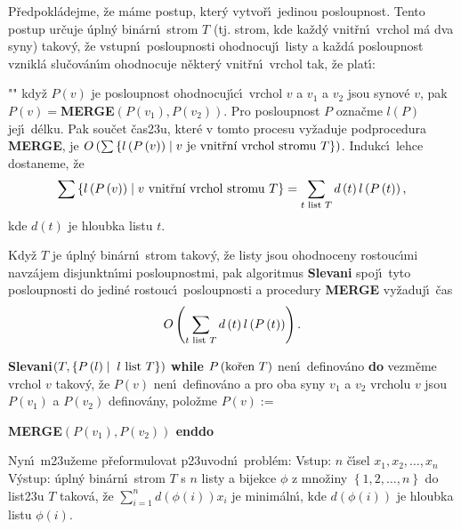 \flushpar P\v redpokl\'adejme, \v ze m\'ame postup, kter\'y vytvo\v r\'\i\ 
jedinou po\-sloupnost. Tento postup ur\v cuje \'upln\'y 
bin\'arn\'\i\ strom $T$ (tj. strom, kde ka\v zd\'y vnit\v rn\'\i\ 
vrchol m\'a dva syny) tako\-v\'y, \v ze vstupn\'\i\ posloupnosti 
ohodnocuj\'\i\ listy a ka\v zd\'a posloupnost vznik\-l\'a slu\v cov\'an\'\i m 
ohodnocuje n\v ekter\'y vnit\v rn\'\i\ vrchol tak, \v ze plat\'\i :
\roster
\item"{}"
kdy\v z $P\left(v\right)$ je posloupnost ohodnocuj\'\i c\'\i\ vrchol $v$ 
a $v_1$ a $v_2$ jsou synov\'e $v$, pak 
$P\left(v\right)=${\bf MERGE$\left(P\left(v_1\right),P\left(v_2\right)\right)$}.
\endroster
Pro posloupnost $P$ ozna\v cme $l\left(P\right)$ jej\'\i\ d\'elku. Pak sou\v cet 
\v cas\accent23u, kter\'e v tomto procesu vy\v zaduje 
podprocedura {\bf MERGE},
je $O\left(\sum \left\{l\left(P\left(v\right)\right)\mid v\text{\rm \ je vnit\v rn\'\i\ vrchol stromu }
T\right\}\right)$. Indukc\'\i\ 
lehce dostaneme, \v ze 
$$\sum \left\{l\left(P\left(v\right)\right)\mid v\text{\rm\ vnit\v rn\'\i\ vrchol stromu }T\right\}
=\sum_{t\text{\rm\ list }T}d\left(t\right)l\left(P\left(t\right)\right),$$
kde $d\left(t\right)$ je hloubka listu $t$.
\medskip

\flushpar Kdy\v z $T$ je \'upln\'y bin\'arn\'\i\ strom takov\'y, \v ze listy
jsou ohodnoceny rostouc\'\i mi navz\'ajem disjunktn\'\i mi 
posloupnostmi, pak algoritmus {\bf Slevani} spoj\'\i\ tyto  
posloupnosti do jedin\'e rostouc\'\i\ posloupnosti a procedury 
{\bf MERGE}  vy\v zaduj\'\i\ \v cas 
$$O\left(\sum_{t\text{\rm\ list }T}d\left(t\right)l\left(P\left(t\right)\right)\right).$$
\bigskip

{\bf Slevani$\left(T,\left\{P\left(l\right)\mid\;l\text{\rm \ {list }}T\right\}\right)$\newline }
{\bf while} $P\left(\text{\rm ko\v ren }T\right)$ nen\'\i\ definov\'ano {\bf do}\newline 
vezm\v eme vrchol $v$ takov\'y, \v ze $P\left(v\right)$ nen\'\i\ definov\'ano 
a pro oba syny $v_1$ a $v_2$ vrcholu $v$ jsou $P\left(v_1\right)$ a $P\left(v_2\right)$ 
definov\'any, polo\v zme $P\left(v\right):=${\bf MERGE$\left(P\left(v_1\right),P\left(v_2\right)\right)$\newline 
enddo
\bigskip

}\flushpar Nyn\'\i\ m\accent23u\v zeme p\v reformulovat p\accent23uvodn\'\i\ 
probl\'em:\newline 
Vstup: $n$ \v c\'\i sel $x_1,x_2,\dots,x_n$\newline 
V\'ystup: \'upln\'y bin\'arn\'\i\ strom $T$ s $n$ listy a bijekce $
\phi$ z 
mno\v ziny $\left\{1,2,\dots,n\right\}$ do list\accent23u $T$ takov\'a, \v ze 
$\sum_{i=1}^nd\left(\phi \left(i\right)\right)x_i$ je minim\'aln\'\i , kde $d\left(\phi \left(i\right)\right)$ je hloubka 
listu $\phi \left(i\right)$. 
\medskip

